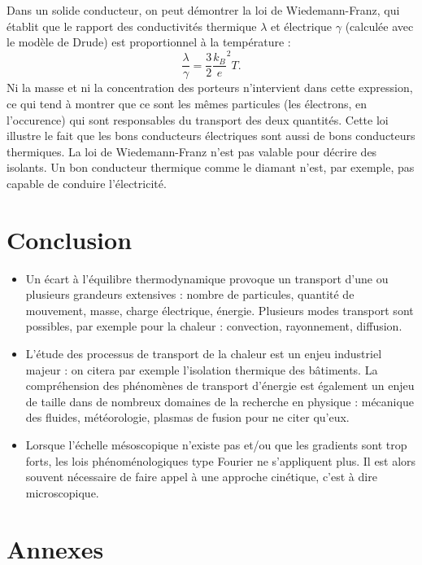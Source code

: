 \documentclass[11pt,a4paper]{report}
\begin{document}
Dans un solide conducteur, on peut démontrer la loi de Wiedemann-Franz, qui établit que le rapport des conductivités thermique $\lambda$ et électrique $\gamma$ (calculée avec le modèle de Drude) est proportionnel à la température :
\begin{equation}
	\frac{\lambda}{\gamma} = \frac{3}{2}\frac{k_B}{e}^2 T.
\end{equation}
Ni la masse et ni la concentration des porteurs n'intervient dans cette expression, ce qui tend à montrer que ce sont les mêmes particules (les électrons, en l'occurence) qui sont responsables du transport des deux quantités. Cette loi illustre le fait que les bons conducteurs électriques sont aussi de bons conducteurs thermiques. La loi de Wiedemann-Franz n'est pas valable pour décrire des isolants. Un bon conducteur thermique comme le diamant n'est, par exemple, pas capable de conduire l'électricité.
 
\section{Conclusion}

\begin{itemize}
\item Un écart à l'équilibre thermodynamique provoque un transport d'une ou plusieurs grandeurs extensives : nombre de particules, quantité de mouvement, masse, charge électrique, énergie. Plusieurs modes transport sont possibles, par exemple pour la chaleur : convection, rayonnement, diffusion.\\

\item L'étude des processus de transport de la chaleur est un enjeu industriel majeur : on citera par exemple l'isolation thermique des bâtiments. La compréhension des phénomènes de transport d'énergie est également un enjeu de taille dans de nombreux domaines de la recherche en physique : mécanique des fluides, météorologie, plasmas de fusion pour ne citer qu'eux.\\

\item Lorsque l'échelle mésoscopique n'existe pas et/ou que les gradients sont trop forts, les lois phénoménologiques type Fourier ne s'appliquent plus. Il est alors souvent nécessaire de faire appel à une approche cinétique, c'est à dire microscopique.
\end{itemize}

\section*{Annexes}
\end{document}
